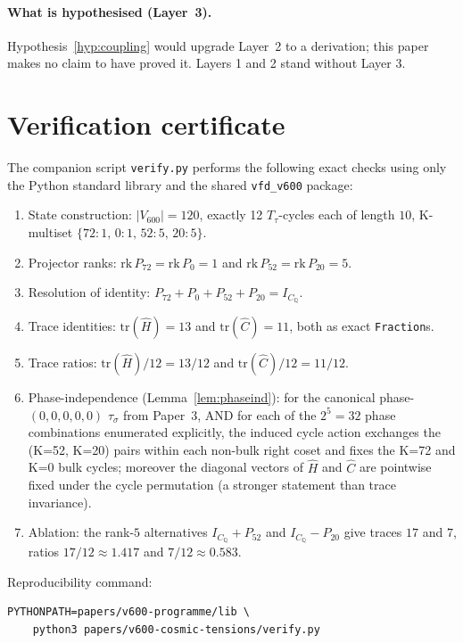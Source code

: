 \documentclass[11pt]{article}
\newcommand{\Vsixhundred}{V_{600}}
\newcommand{\CQ}{C_{\mathbb{Q}}}
\newcommand{\IC}{I_{\CQ}}
\newcommand{\PK}[1]{P_{#1}}
\newcommand{\Hop}{\hat H}
\newcommand{\Cop}{\hat C}
\begin{document}
\paragraph{What is hypothesised (Layer~3).}
Hypothesis~\ref{hyp:coupling} would upgrade Layer~2 to a derivation;
this paper makes no claim to have proved it. Layers 1 and 2 stand
without Layer 3.

\appendix

\section{Verification certificate}\label{app:verify}

The companion script \texttt{verify.py} performs the following exact
checks using only the Python standard library and the shared
\texttt{vfd\_v600} package:
\begin{enumerate}[leftmargin=2em]
\item State construction: $|\Vsixhundred| = 120$, exactly 12
$T_\tau$-cycles each of length $10$, K-multiset
$\{72{:}1,\,0{:}1,\,52{:}5,\,20{:}5\}$.
\item Projector ranks: $\mathrm{rk}\,\PK{72} = \mathrm{rk}\,\PK{0} = 1$
and $\mathrm{rk}\,\PK{52} = \mathrm{rk}\,\PK{20} = 5$.
\item Resolution of identity:
$\PK{72} + \PK{0} + \PK{52} + \PK{20} = \IC$.
\item Trace identities: $\mathrm{tr}(\Hop) = 13$ and
$\mathrm{tr}(\Cop) = 11$, both as exact \texttt{Fraction}s.
\item Trace ratios: $\mathrm{tr}(\Hop)/12 = 13/12$ and
$\mathrm{tr}(\Cop)/12 = 11/12$.
\item Phase-independence (Lemma~\ref{lem:phaseind}): for the
canonical phase-$(0,0,0,0,0)$ $\tau_\sigma$ from Paper~3, AND for
each of the $2^5 = 32$ phase combinations enumerated explicitly,
the induced cycle action exchanges the (K=52, K=20) pairs within
each non-bulk right coset and fixes the K=72 and K=0 bulk cycles;
moreover the diagonal vectors of $\Hop$ and $\Cop$ are pointwise
fixed under the cycle permutation (a stronger statement than
trace invariance).
\item Ablation: the rank-$5$ alternatives $\IC + \PK{52}$ and
$\IC - \PK{20}$ give traces $17$ and $7$, ratios
$17/12 \approx 1.417$ and $7/12 \approx 0.583$.
\end{enumerate}
Reproducibility command:
\begin{verbatim}
PYTHONPATH=papers/v600-programme/lib \
    python3 papers/v600-cosmic-tensions/verify.py
\end{verbatim}



\end{document}

